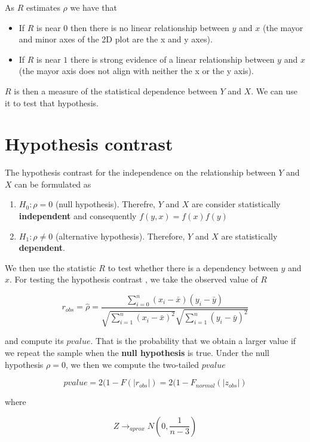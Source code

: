 \documentclass[
]{book}
\begin{document}
As \(R\) estimates \(\rho\) we have that

\begin{itemize}
\item
  If \(R\) is near \(0\) then there is no linear relationship between \(y\) and \(x\) (the mayor and minor axes of the 2D plot are the x and y axes).
\item
  If \(R\) is near \(1\) there is strong evidence of a linear relationship between \(y\) and \(x\) (the mayor axis does not align with neither the x or the y axis).
\end{itemize}

\(R\) is then a measure of the statistical dependence between \(Y\) and \(X\). We can use it to test that hypothesis.

\hypertarget{hypothesis-contrast}{%
\section{Hypothesis contrast}\label{hypothesis-contrast}}

The hypothesis contrast for the independence on the relationship between \(Y\) and \(X\) can be formulated as

\begin{enumerate}
\def\labelenumi{\alph{enumi}.}
\item
  \(H_0: \rho=0\) (null hypothesis). Therefre, \(Y\) and \(X\) are consider statistically \textbf{independent} and consequently \(f(y,x)=f(x)f(y)\)
\item
  \(H_1: \rho \neq 0\) (alternative hypothesis). Therefore, \(Y\) and \(X\) are statistically \textbf{dependent}.
\end{enumerate}

We then use the statistic \(R\) to test whether there is a dependency between \(y\) and \(x\). For testing the hypothesis contrast , we take the observed value of \(R\)

\[r_{obs}=\hat{\rho}=\frac{\sum_{i=0}^n(x_i-\bar{x})(y_i-\bar{y})}{\sqrt{\sum_{i=1}^n(x_i-\bar{x})^2}\sqrt{\sum_{i=1}^n(y_i-\bar{y})^2}}\]

and compute its \(pvalue\). That is the probability that we obtain a larger value if we repeat the sample when the \textbf{null hypothesis} is true. Under the null hypothesis \(\rho=0\), we then we compute the two-tailed \(pvalue\)

\[pvalue=2(1- F(|r_{obs}|)= 2(1- F_{normal}(|z_{obs}|)  \]

where

\[Z \rightarrow_{aprox} N(0, \frac{1}{n-3})\]
\end{document}
